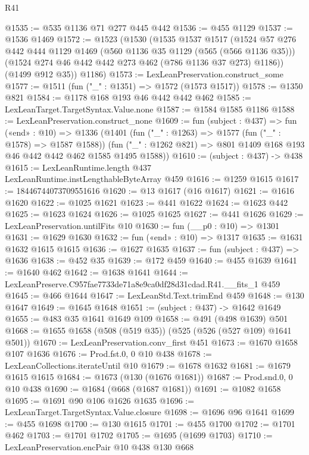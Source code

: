 \begin{lexlean}{R41}
\begin{coremodule}
@1535 := @535 @1136 @71 @277 @445 @442
@1536 := @455 @1129
@1537 := @1536 @1469
@1572 := @1523
    (@1530
      (@1535
        @1537
        @1517
        (@1524
          @57
          @276
          @442
          @444
          @1129
          @1469
          (@560 @1136 @35 @1129 (@565 (@566 @1136 @35)))
          (@1524 @274 @46 @442 @442 @273 @462 (@786 @1136 @37 @273) @1186))
        (@1499 @912 @35))
      @1186)
@1573 := LexLeanPreservation.construct_some
@1577 := @1511 (fun ("_" : @1351) => @1572 (@1573 @1517))
@1578 := @1350 @821
@1584 := @1178 @168 @193 @46 @442 @442 @462
@1585 := LexLeanTarget.TargetSyntax.Value.none
@1587 := @1584 @1585 @1186
@1588 := LexLeanPreservation.construct_none
@1609 := fun (subject : @437) =>
  fun («end» : @10) =>
  @1336
    (@1401
      (fun ("_" : @1263) => @1577 (fun ("_" : @1578) => @1587 @1588))
      (fun ("_" : @1262 @821) => @801 @1409 @168 @193 @46 @442 @442 @462 @1585 @1495 @1588))
@1610 := (subject : @437) -> @438
@1615 := LexLeanRuntime.length @437 LexLeanRuntime.instLengthableByteArray @459
@1616 := @1259 @1615
@1617 := 18446744073709551616
@1620 := @13 @1617 (@16 @1617)
@1621 := @1616 @1620
@1622 := @1025 @1621
@1623 := @441 @1622
@1624 := @1623 @442
@1625 := @1623 @1624
@1626 := @1025 @1625
@1627 := @441 @1626
@1629 := LexLeanPreservation.untilFits @10
@1630 := fun (__p0 : @10) => @1301
@1631 := @1629 @1630
@1632 := fun («end» : @10) => @1317
@1635 := @1631 @1632 @1615 @1615
@1636 := @1627 @1635
@1637 := fun (subject : @437) => @1636
@1638 := @452 @35
@1639 := @172 @459
@1640 := @455 @1639
@1641 := @1640 @462
@1642 := @1638 @1641
@1644 := LexLeanPreserve.C957fae7733de71a8e9ca0df28d31cdad.R41.__fits_1 @459
@1645 := @466 @1644
@1647 := LexLeanStd.Text.trimEnd @459
@1648 := @130 @1647
@1649 := @1645 @1648
@1651 := (subject : @437) -> @1642 @1649
@1655 := @483 @35 @1641 @1649 @109
@1658 := @491 (@498 @1639) @501
@1668 := @1655 @1658 (@508 (@519 @35)) (@525 (@526 (@527 @109) @1641 @501))
@1670 := LexLeanPreservation.conv_first @451
@1673 := @1670 @1658 @107 @1636
@1676 := Prod.fst.{0, 0} @10 @438
@1678 := LexLeanCollections.iterateUntil @10
@1679 := @1678 @1632
@1681 := @1679 @1615 @1615
@1684 := @1673 (@130 (@1676 @1681))
@1687 := Prod.snd.{0, 0} @10 @438
@1690 := @1684 (@668 (@1687 @1681))
@1691 := @1082 @1658
@1695 := @1691 @90 @106 @1626 @1635
@1696 := LexLeanTarget.TargetSyntax.Value.closure
@1698 := @1696 @96 @1641
@1699 := @455 @1698
@1700 := @130 @1615
@1701 := @455 @1700
@1702 := @1701 @462
@1703 := @1701 @1702
@1705 := @1695 (@1699 @1703)
@1710 := LexLeanPreservation.encPair @10 @438 @130 @668

\end{coremodule}
\end{lexlean}

